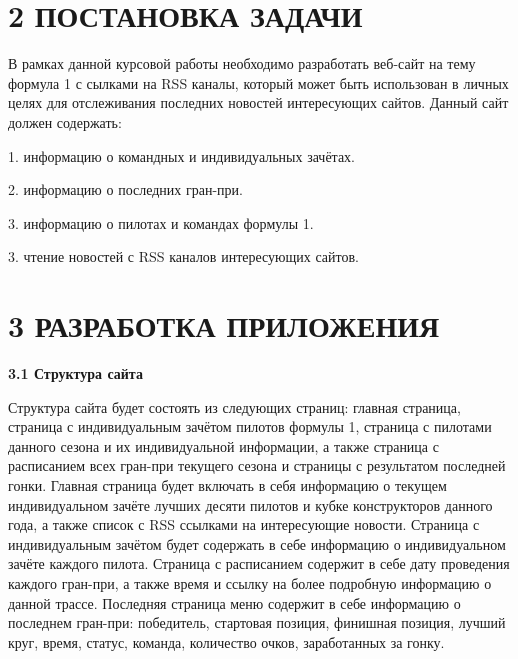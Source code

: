 \documentclass[14pt,a4paper]{extreport}
\begin{document}
	\newpage
	\section*{\normalsize\hspace{4ex}2 ПОСТАНОВКА ЗАДАЧИ}

\flushleft\hspace{4ex}В рамках данной курсовой работы необходимо разработать веб-сайт на тему формула 1 с сылками на RSS каналы, который может быть использован в личных целях для отслеживания последних новостей интересующих сайтов. Данный сайт должен содержать:

\hspace {4ex}1.	информацию о командных и индивидуальных зачётах.\

\hspace{4ex}2.	информацию о последних гран-при.\

\hspace{4ex}3.	информацию о пилотах и командах формулы 1.\

\hspace{4ex}3.	чтение новостей с RSS каналов интересующих сайтов.\




	\newpage
	\section*{\normalsize\hspace{4ex}3 РАЗРАБОТКА ПРИЛОЖЕНИЯ}
	
	
	\flushleft\hspace{4ex}\textbf{3.1 Структура сайта}
	
\flushleft\hspace{4ex}Структура сайта будет состоять из следующих страниц: главная страница, страница с индивидуальным зачётом пилотов формулы 1, страница с пилотами данного сезона и их индивидуальной информации, а также страница с расписанием всех гран-при текущего сезона и страницы с результатом последней гонки. Главная страница будет включать в себя информацию о текущем индивидуальном зачёте лучших десяти пилотов и кубке конструкторов данного года, а также список с RSS ссылками на интересующие новости. Страница с индивидуальным зачётом будет содержать в себе информацию о индивидуальном зачёте каждого пилота. Страница с расписанием содержит в себе дату проведения каждого гран-при, а также время и ссылку на более подробную информацию о данной трассе. Последняя страница меню содержит в себе информацию о последнем гран-при: победитель, стартовая позиция, финишная позиция, лучший круг, время, статус, команда, количество очков, заработанных за гонку.\par
	
\end{document}
